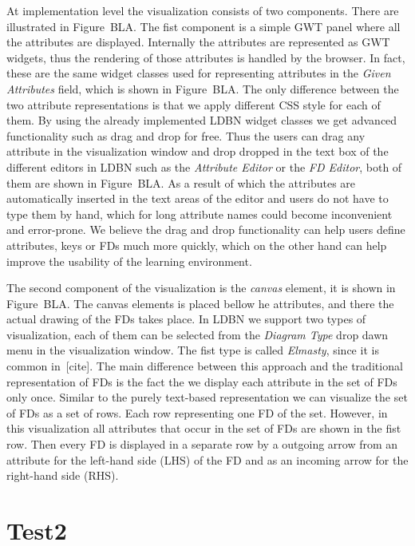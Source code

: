 At implementation level the visualization consists of two components. 
There are illustrated in Figure~BLA.
The fist component is a simple GWT panel where all the attributes are displayed. Internally 
the attributes are represented as GWT widgets, thus the rendering of those attributes is
handled by the browser. In fact, these are the same widget classes used for representing
attributes in the \emph{Given Attributes} field, which is shown in Figure~BLA. The only 
difference between the two attribute representations is 
that we apply different CSS style for each of them. By using the already implemented LDBN 
widget classes we get advanced functionality such as drag and drop for free. Thus the users
can drag any attribute in the visualization window and drop 
dropped in the text box of the different editors in LDBN
such as the \emph{Attribute Editor} or the \emph{FD Editor}, both of them are shown in Figure~BLA. 
As a result of which the
attributes are automatically inserted in the text areas of the editor and users do not have
to type them by hand, which for long attribute names could become inconvenient and error-prone. 
We believe the drag and drop functionality can help
users define attributes, keys or FDs much more quickly, which on the other hand can
help improve the usability of the learning environment. 

The second component of the visualization is the \emph{canvas} element, it is shown in Figure~BLA.
The canvas elements is placed bellow he attributes, and there the actual drawing 
of the FDs takes place. In LDBN we support two types of visualization, each of them can be selected
from the \emph{Diagram Type} drop dawn menu in the visualization window. The fist type is called 
\emph{Elmasty}, since it is common in~[cite]. The main difference between this approach and
the traditional representation of FDs is the fact the we display each attribute in the set of 
FDs only once. 
Similar to the purely text-based representation we can visualize the set
of FDs as a set of rows. Each row representing one FD of the set. 
However, in this visualization all attributes that occur in the set of FDs
are shown in the fist row. Then every FD is displayed in a separate row by a outgoing 
arrow from an attribute for the left-hand side (LHS) of the FD 
and as an incoming arrow for the right-hand side (RHS).

\section{Test2}
\label{sec:test2}
